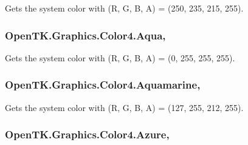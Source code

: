 Gets the system color with (R, G, B, A) = (250, 235, 215, 255). 

\hypertarget{struct_open_t_k_1_1_graphics_1_1_color4_a8e51eee5fbb7ec761d97489cdbf2e665}{
\subsubsection[{Aqua}]{ Open\-T\-K.\-Graphics.\-Color4.\-Aqua\hspace{0.3cm}{\ttfamily [static]}, {\ttfamily [get]}}}\label{struct_open_t_k_1_1_graphics_1_1_color4_a8e51eee5fbb7ec761d97489cdbf2e665}


Gets the system color with (R, G, B, A) = (0, 255, 255, 255). 

\hypertarget{struct_open_t_k_1_1_graphics_1_1_color4_a30856b5a2ea4119c5161f84c4a01f363}{
\subsubsection[{Aquamarine}]{ Open\-T\-K.\-Graphics.\-Color4.\-Aquamarine\hspace{0.3cm}{\ttfamily [static]}, {\ttfamily [get]}}}\label{struct_open_t_k_1_1_graphics_1_1_color4_a30856b5a2ea4119c5161f84c4a01f363}


Gets the system color with (R, G, B, A) = (127, 255, 212, 255). 

\hypertarget{struct_open_t_k_1_1_graphics_1_1_color4_ad21feb20ee214cb7a6368eafe6ca35f9}{
\subsubsection[{Azure}]{ Open\-T\-K.\-Graphics.\-Color4.\-Azure\hspace{0.3cm}{\ttfamily [static]}, {\ttfamily [get]}}}\label{struct_open_t_k_1_1_graphics_1_1_color4_ad21feb20ee214cb7a6368eafe6ca35f9}


